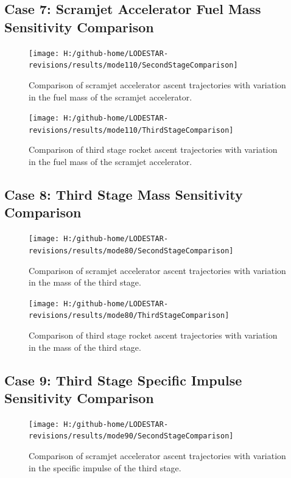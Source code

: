 \subsection{Case 7: Scramjet Accelerator Fuel Mass Sensitivity Comparison}\label{sec:app_comparison110}
\begin{figure}[!th]
\centering
\texttt{[image: H:/github-home/LODESTAR-revisions/results/mode110/SecondStageComparison]}
\caption{Comparison of scramjet accelerator ascent trajectories with variation in the fuel mass of the scramjet accelerator.}
\label{fig:SecondStageComparison5}
\end{figure}

\begin{figure}[!th]
\centering
\texttt{[image: H:/github-home/LODESTAR-revisions/results/mode110/ThirdStageComparison]}
\caption{Comparison of third stage rocket ascent trajectories with variation in the fuel mass of the scramjet accelerator.}
\label{fig:ThirdStageComparison5}
\end{figure}
\FloatBarrier
\clearpage
\subsection{Case 8: Third Stage Mass Sensitivity Comparison}\label{sec:app_comparison80}

\begin{figure}[!th]
\centering
\texttt{[image: H:/github-home/LODESTAR-revisions/results/mode80/SecondStageComparison]}
\caption{Comparison of scramjet accelerator ascent trajectories with variation in the mass of the third stage.}
\label{fig:SecondStageComparison6}
\end{figure}


\begin{figure}[!th]
\centering
\texttt{[image: H:/github-home/LODESTAR-revisions/results/mode80/ThirdStageComparison]}
\caption{Comparison of third stage rocket ascent trajectories with variation in the mass of the third stage.}
\label{fig:ThirdStageComparison6}
\end{figure}

\FloatBarrier
\clearpage
\subsection{Case 9: Third Stage Specific Impulse Sensitivity Comparison}\label{sec:app_comparison90}

\begin{figure}[!th]
	\centering
	\texttt{[image: H:/github-home/LODESTAR-revisions/results/mode90/SecondStageComparison]}
	\caption{Comparison of scramjet accelerator ascent trajectories with variation in the specific impulse of the third stage.}
	\label{fig:SecondStageComparison7}
\end{figure}

